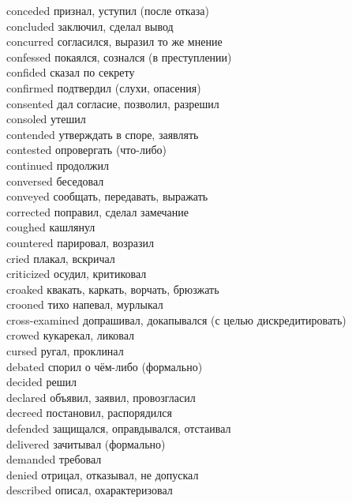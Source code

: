 conceded \hfill признал, уступил (после отказа)\\
concluded \hfill заключил, сделал вывод\\
concurred \hfill согласился, выразил то же мнение\\
confessed \hfill покаялся, сознался (в преступлении)\\
confided \hfill сказал по секрету\\
confirmed \hfill подтвердил (слухи, опасения)\\
consented \hfill дал согласие, позволил, разрешил\\
consoled \hfill утешил\\
contended \hfill утверждать в споре, заявлять\\
contested \hfill опровергать (что-либо)\\
continued \hfill продолжил\\
conversed \hfill беседовал\\
conveyed \hfill сообщать, передавать, выражать\\
corrected \hfill поправил, сделал замечание\\
coughed \hfill кашлянул\\
countered \hfill парировал, возразил\\
cried \hfill плакал, вскричал\\
criticized \hfill осудил, критиковал\\
croaked \hfill квакать, каркать, ворчать, брюзжать\\
crooned \hfill тихо напевал, мурлыкал\\
cross-examined \hfill допрашивал, докапывался (с целью дискредитировать)\\
crowed \hfill кукарекал, ликовал\\
cursed \hfill ругал, проклинал\\
debated \hfill спорил о чём-либо (формально)\\
decided \hfill решил\\
declared \hfill объявил, заявил, провозгласил\\
decreed \hfill постановил, распорядился\\
defended \hfill защищался, оправдывался, отстаивал\\
delivered \hfill зачитывал (формально)\\
demanded \hfill требовал\\
denied \hfill отрицал, отказывал, не допускал\\
described \hfill описал, охарактеризовал\\
